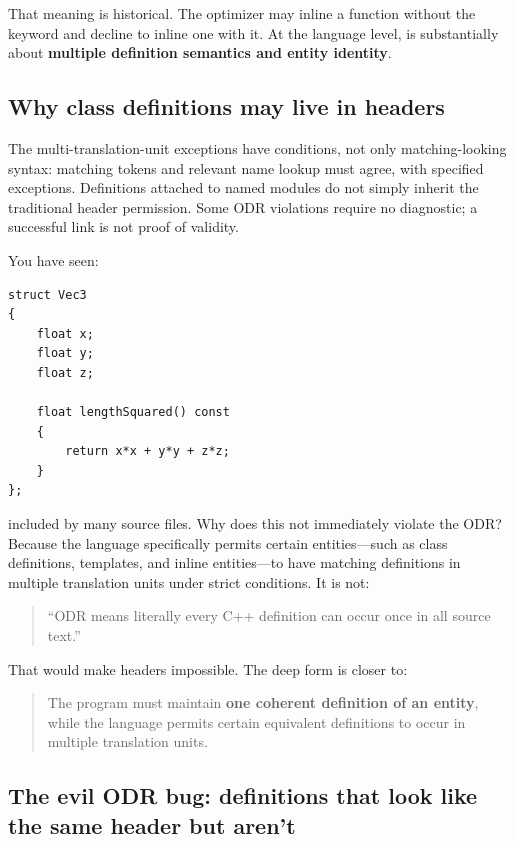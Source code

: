That meaning is historical. The optimizer may inline a function without the  keyword and decline to inline one with it. At the language level,  is substantially about \textbf{multiple definition semantics and entity identity}.

\subsection{Why class definitions may live in headers}\label{01-foundations-i-ch002-why-class-definitions-may-live-in-headers}

\hypertarget{01-foundations-i-ch002-why-class-definitions-may-live-in-headers}{}

The multi-translation-unit exceptions have conditions, not only matching-looking syntax: matching tokens and relevant name lookup must agree, with specified exceptions. Definitions attached to named modules do not simply inherit the traditional header permission. Some ODR violations require no diagnostic; a successful link is not proof of validity.

You have seen:

\begin{verbatim}
struct Vec3
{
    float x;
    float y;
    float z;

    float lengthSquared() const
    {
        return x*x + y*y + z*z;
    }
};
\end{verbatim}

included by many source files. Why does this not immediately violate the ODR? Because the language specifically permits certain entities---such as class definitions, templates, and inline entities---to have matching definitions in multiple translation units under strict conditions. It is not:

\begin{quote}
``ODR means literally every C++ definition can occur once in all source text.''
\end{quote}

That would make headers impossible. The deep form is closer to:

\begin{quote}
The program must maintain \textbf{one coherent definition of an entity}, while the language permits certain equivalent definitions to occur in multiple translation units.
\end{quote}

\subsection{The evil ODR bug: definitions that look like the same header but aren't}\label{01-foundations-i-ch002-the-evil-odr-bug-definitions-that-look-like-the-same-header-but-arent}

